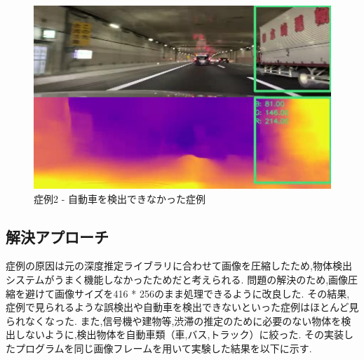 \begin{figure}[hbtp]
 \begin{center}
  \includegraphics[width=12cm]{figs/miss_2.png}
 \end{center}
  \caption{症例2 - 自動車を検出できなかった症例}
  \label{fig:miss2}
\end{figure}

\newpage

\subsection{解決アプローチ}
症例の原因は元の深度推定ライブラリに合わせて画像を圧縮したため,物体検出システムがうまく機能しなかったためだと考えられる.
問題の解決のため,画像圧縮を避けて画像サイズを416 * 256のまま処理できるように改良した.
その結果,症例で見られるような誤検出や自動車を検出できないといった症例はほとんど見られなくなった.
また,信号機や建物等,渋滞の推定のために必要のない物体を検出しないように,検出物体を自動車類（車,バス,トラック）に絞った.
その実装したプログラムを同じ画像フレームを用いて実験した結果を以下に示す.


